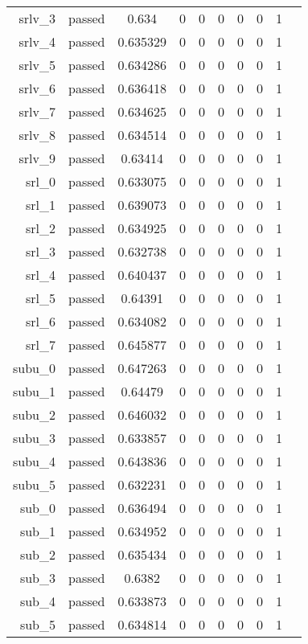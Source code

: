 \begin{longtable}{r|ccccccccc}
    srlv\_3 & passed & 0.634 & 0 & 0 & 0 & 0 & 0 & 1 \\
    srlv\_4 & passed & 0.635329 & 0 & 0 & 0 & 0 & 0 & 1 \\
    srlv\_5 & passed & 0.634286 & 0 & 0 & 0 & 0 & 0 & 1 \\
    srlv\_6 & passed & 0.636418 & 0 & 0 & 0 & 0 & 0 & 1 \\
    srlv\_7 & passed & 0.634625 & 0 & 0 & 0 & 0 & 0 & 1 \\
    srlv\_8 & passed & 0.634514 & 0 & 0 & 0 & 0 & 0 & 1 \\
    srlv\_9 & passed & 0.63414 & 0 & 0 & 0 & 0 & 0 & 1 \\
    srl\_0 & passed & 0.633075 & 0 & 0 & 0 & 0 & 0 & 1 \\
    srl\_1 & passed & 0.639073 & 0 & 0 & 0 & 0 & 0 & 1 \\
    srl\_2 & passed & 0.634925 & 0 & 0 & 0 & 0 & 0 & 1 \\
    srl\_3 & passed & 0.632738 & 0 & 0 & 0 & 0 & 0 & 1 \\
    srl\_4 & passed & 0.640437 & 0 & 0 & 0 & 0 & 0 & 1 \\
    srl\_5 & passed & 0.64391 & 0 & 0 & 0 & 0 & 0 & 1 \\
    srl\_6 & passed & 0.634082 & 0 & 0 & 0 & 0 & 0 & 1 \\
    srl\_7 & passed & 0.645877 & 0 & 0 & 0 & 0 & 0 & 1 \\
    subu\_0 & passed & 0.647263 & 0 & 0 & 0 & 0 & 0 & 1 \\
    subu\_1 & passed & 0.64479 & 0 & 0 & 0 & 0 & 0 & 1 \\
    subu\_2 & passed & 0.646032 & 0 & 0 & 0 & 0 & 0 & 1 \\
    subu\_3 & passed & 0.633857 & 0 & 0 & 0 & 0 & 0 & 1 \\
    subu\_4 & passed & 0.643836 & 0 & 0 & 0 & 0 & 0 & 1 \\
    subu\_5 & passed & 0.632231 & 0 & 0 & 0 & 0 & 0 & 1 \\
    sub\_0 & passed & 0.636494 & 0 & 0 & 0 & 0 & 0 & 1 \\
    sub\_1 & passed & 0.634952 & 0 & 0 & 0 & 0 & 0 & 1 \\
    sub\_2 & passed & 0.635434 & 0 & 0 & 0 & 0 & 0 & 1 \\
    sub\_3 & passed & 0.6382 & 0 & 0 & 0 & 0 & 0 & 1 \\
    sub\_4 & passed & 0.633873 & 0 & 0 & 0 & 0 & 0 & 1 \\
    sub\_5 & passed & 0.634814 & 0 & 0 & 0 & 0 & 0 & 1 \\

\end{longtable}
